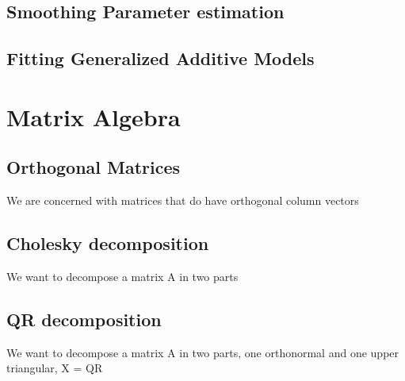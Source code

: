 \documentclass{article}
\begin{document}
    \subsection{Smoothing Parameter estimation}
    \subsection{Fitting Generalized Additive Models}

    \section{Matrix Algebra}
    \subsection{Orthogonal Matrices}
    We are concerned with matrices that do have orthogonal column vectors
    \subsection{Cholesky decomposition}
    We want to decompose a matrix A in two parts
    \subsection{QR decomposition}
    We want to decompose a matrix A in two parts, one orthonormal and one upper triangular, X = QR


    \newpage


    \newpage
\end{document}
